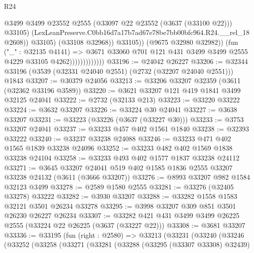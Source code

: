 \begin{lexlean}{R24}
\begin{coremodule}
                                          @3499
                                          @3499
                                          @23552
                                          @2555
                                          (@33097 @22 @23552 (@3637 (@33100 @22)))
                                          @33105)
                                        (LexLeanPreserve.C0bb16d7a17b7ad67e78be7bb00bfc964.R24.__rel_18
                                          @2608))
                                      @33105)
                                    (@33108 @32968))
                                  @33105))
                              (@9675 @32980 @32982))
                            (fun ("_" : @32135 @4141) =>
                            @3671
                              @33060
                              @701
                              @121
                              @431
                              @3499
                              @3499
                              @2555
                              @4229
                              @33105
                              @4262)))))))))))))
@33196 := @24042 @26227
@33206 := @32344 @33196 (@3539 (@32331 @24040 @2551) (@2732 (@32207 @24040 @2551))) @1843
@33207 := @30379 @24056
@33213 := @33206 @33207 @32359 (@3611 (@32362 @33196 @3589))
@33220 := @3621 @33207 @121 @419 @1841 @3499 @32125 @24041
@33222 := @2732 (@32133 @213)
@33223 := @33220 @33222
@33224 := @3632 @33207
@33226 := @33224 @30 @24041
@33227 := @3638 @33207
@33231 := @33223 (@33226 (@3637 (@33227 @30)))
@33233 := @3753 @33207 @24041
@33237 := @33233 @457 @402 @1561 @1840
@33238 := @32393 @33222
@33240 := @33237 @33238 @24088
@33246 := @33233 @471 @402 @1565 @1839 @33238 @24096
@33252 := @33233 @482 @402 @1569 @1838 @33238 @24104
@33258 := @33233 @493 @402 @1577 @1837 @33238 @24112
@33271 := @3645
    @33207
    @24041
    @519
    @402
    @1585
    @1836
    @2555
    @33207
    @33238
    @24132
    (@3611 (@3666 @33207))
@33276 := @8993 @33207 @982 @1584 @32123 @3499
@33278 := @2589 @1580 @2555
@33281 := @33276 (@32405 @33278) @33222
@33282 := @3930 @33207
@33288 := @33282 @1558 @1583 @32121 @3501 @26234 @33278
@33295 := @3998 @33207 @309 @851 @3501 @26230 @26227 @26234
@33307 := @33282 @421 @431 @3499 @3499 @26225 @2555 (@33224 @22 @26225 (@3637 (@33227 @22)))
@33308 := @3681 @33207
@33336 := @33195
    (fun (right : @2580) =>
    @33213
      (@33231
        (@33240
          (@33246
            (@33252
              (@33258
                (@33271
                  (@33281
                    (@33288
                      (@33295 (@33307 @33308) @32439)

\end{coremodule}
\end{lexlean}
